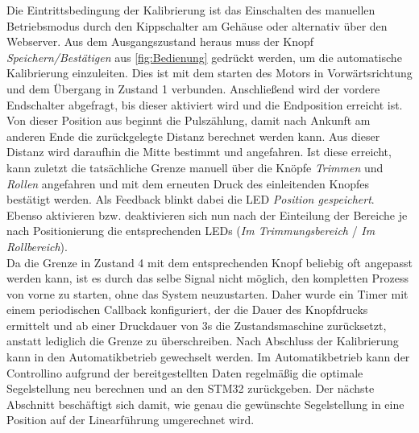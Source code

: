 \noindent
Die Eintrittsbedingung der Kalibrierung ist das Einschalten des manuellen Betriebsmodus durch den Kippschalter am Gehäuse oder alternativ über den Webserver. Aus dem Ausgangszustand heraus muss der Knopf \textit{Speichern/Bestätigen} aus \autoref{fig:Bedienung} gedrückt werden, um die automatische Kalibrierung einzuleiten. Dies ist mit dem starten des Motors in Vorwärtsrichtung und dem Übergang in Zustand 1 verbunden. Anschließend wird der vordere Endschalter abgefragt, bis dieser aktiviert wird und die Endposition erreicht ist. Von dieser Position aus beginnt die Pulszählung, damit nach Ankunft am anderen Ende die zurückgelegte Distanz berechnet werden kann. Aus dieser Distanz wird daraufhin die Mitte bestimmt und angefahren. Ist diese erreicht, kann zuletzt die tatsächliche Grenze manuell über die Knöpfe \textit{Trimmen} und \textit{Rollen} angefahren und mit dem erneuten Druck des einleitenden Knopfes bestätigt werden. Als Feedback blinkt dabei die LED \textit{Position gespeichert}. Ebenso aktivieren bzw. deaktivieren sich nun nach der Einteilung der Bereiche je nach Positionierung die entsprechenden LEDs (\textit{Im Trimmungsbereich} / \textit{Im Rollbereich}).\\

\noindent
Da die Grenze in Zustand 4 mit dem entsprechenden Knopf beliebig oft angepasst werden kann, ist es durch das selbe Signal nicht möglich, den kompletten Prozess von vorne zu starten, ohne das System neuzustarten. Daher wurde ein Timer mit einem periodischen Callback konfiguriert, der die Dauer des Knopfdrucks ermittelt und ab einer Druckdauer von 3s die Zustandsmaschine zurücksetzt, anstatt lediglich die Grenze zu überschreiben. Nach Abschluss der Kalibrierung kann in den Automatikbetrieb gewechselt werden. Im Automatikbetrieb kann der Controllino aufgrund der bereitgestellten Daten regelmäßig die optimale Segelstellung neu berechnen und an den STM32 zurückgeben. Der nächste Abschnitt beschäftigt sich damit, wie genau die gewünschte Segelstellung in eine Position auf der Linearführung umgerechnet wird. 
